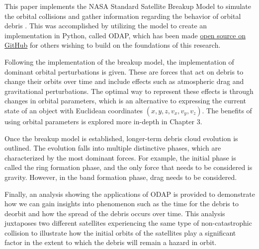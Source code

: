 \documentclass[a4paper, 12pt]{article}
\begin{document}
This paper implements the NASA Standard Satellite Breakup Model to simulate the orbital collisions and gather information regarding the behavior of orbital debris \citep{johnson_nasas_2001}. This was accomplished by utilizing the model to create an implementation in Python, called ODAP, which has been made \href{https://github.com/ReeceHumphreys/OrbitalDebris}{open source on GitHub} for others wishing to build on the foundations of this research.

Following the implementation of the breakup model, the implementation of dominant orbital perturbations is given. These are forces that act on debris to change their orbits over time and include effects such as atmospheric drag and gravitational perturbations. The optimal way to represent these effects is through changes in orbital parameters, which is an alternative to expressing the current state of an object with Euclidean coordinates $(x,y,z, v_x, v_y, v_z)$. The benefits of using orbital parameters is explored more in-depth in Chapter 3.

Once the breakup model is established, longer-term debris cloud evolution is outlined. The evolution falls into multiple distinctive phases, which are characterized by the most dominant forces. For example, the initial phase is called the ring formation phase, and the only force that needs to be considered is gravity. However, in the band formation phase, drag needs to be considered.

Finally, an analysis showing the applications of ODAP is provided to demonstrate how we can gain insights into phenomenon such as the time for the debris to deorbit and how the spread of the debris occurs over time. This analysis juxtaposes two different satellites experiencing the same type of non-catastrophic collision to illustrate how the initial orbits of the satellites play a significant factor in the extent to which the debris will remain a hazard in orbit.
\end{document}
